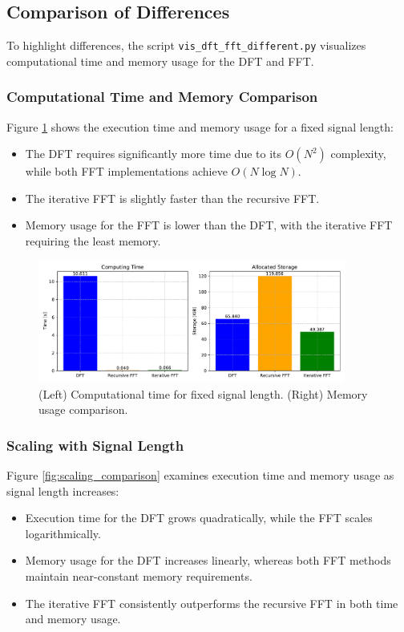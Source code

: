 \documentclass[12pt, a4paper]{report}
\begin{document}
\subsection{Comparison of Differences}
To highlight differences, the script \texttt{vis\_dft\_fft\_different.py} visualizes computational time and memory usage for the \ac{DFT} and \ac{FFT}.

\subsubsection{Computational Time and Memory Comparison}
Figure \ref{fig:time_memory_comparison} shows the execution time and memory usage for a fixed signal length:
\begin{itemize}
	\item The \ac{DFT} requires significantly more time due to its \(O(N^2)\) complexity, while both \ac{FFT} implementations achieve \(O(N \log N)\).
	\item The iterative \ac{FFT} is slightly faster than the recursive \ac{FFT}.
	\item Memory usage for the \ac{FFT} is lower than the \ac{DFT}, with the iterative \ac{FFT} requiring the least memory.
\end{itemize}

\begin{figure}[h!]
	\centering
	\includegraphics[width=0.9\textwidth]{figures/dft_fftr_ffti.pdf}
	\caption{(Left) Computational time for fixed signal length. (Right) Memory usage comparison.}
	\label{fig:time_memory_comparison}
\end{figure}

\subsubsection{Scaling with Signal Length}
Figure \ref{fig:scaling_comparison} examines execution time and memory usage as signal length increases:
\begin{itemize}
	\item Execution time for the \ac{DFT} grows quadratically, while the \ac{FFT} scales logarithmically.
	\item Memory usage for the \ac{DFT} increases linearly, whereas both \ac{FFT} methods maintain near-constant memory requirements.
	\item The iterative \ac{FFT} consistently outperforms the recursive \ac{FFT} in both time and memory usage.
\end{itemize}
\end{document}
